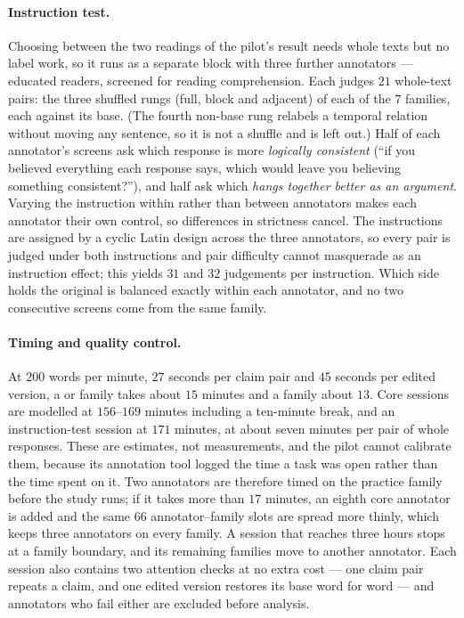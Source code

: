 \paragraph{Instruction test.} Choosing between the two readings of the pilot's  result needs whole
texts but no label work, so it runs as a separate block with three further annotators --- educated readers,
screened for reading comprehension. Each judges $21$ whole-text pairs: the three shuffled rungs (full, block and
adjacent) of each of the $7$  families, each against its base. (The fourth non-base 
rung relabels a temporal relation without moving any sentence, so it is not a shuffle and is left out.) Half of
each annotator's screens ask which response is more \emph{logically consistent} (``if you believed everything each
response says, which would leave you believing something consistent?''), and half ask which \emph{hangs together
better as an argument}. Varying the instruction within rather than between annotators makes each annotator their
own control, so differences in strictness cancel. The instructions are assigned by a cyclic Latin design across the
three annotators, so every pair is judged under both instructions and pair difficulty cannot masquerade as an
instruction effect; this yields $31$ and $32$ judgements per instruction. Which side holds the original is balanced
exactly within each annotator, and no two consecutive screens come from the same family.

\paragraph{Timing and quality control.} At $200$ words per minute, $27$ seconds per claim pair and $45$ seconds
per edited version, a  or  family takes about $15$ minutes and a 
family about $13$. Core sessions are modelled at $156$--$169$ minutes including a ten-minute break, and an
instruction-test session at $171$ minutes, at about seven minutes per pair of whole responses. These are estimates,
not measurements, and the pilot cannot calibrate them, because its annotation tool logged the time a task was open
rather than the time spent on it. Two annotators are therefore timed on the practice family before the study runs;
if it takes more than $17$ minutes, an eighth core annotator is added and the same $66$ annotator--family slots are
spread more thinly, which keeps three annotators on every family. A session that reaches three hours stops at a
family boundary, and its remaining families move to another annotator. Each session also contains two attention
checks at no extra cost --- one claim pair repeats a claim, and one edited version restores its base word for word
--- and annotators who fail either are excluded before analysis.

